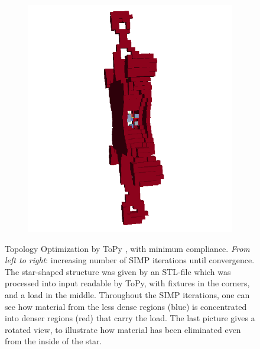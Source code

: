 \begin{figure}
\begin{subfigure}[c]{.24\linewidth}
\end{subfigure}
\begin{subfigure}[c]{.24\linewidth}
\centering
  \includegraphics[width=\linewidth]{Pictures/TopOp/Star_Optimized5_Trans.png}
\end{subfigure}
\caption{Topology Optimization by ToPy \cite{ToPy}, with minimum compliance. \emph{From left to right}: increasing number of SIMP iterations until convergence. The star-shaped structure was given by an STL-file which was processed into input readable by ToPy, with fixtures in the corners, and a load in the middle. Throughout the SIMP iterations, one can see how material from the less dense regions (blue) is concentrated into denser regions (red) that carry the load. The last picture gives a rotated view, to illustrate how material has been eliminated even from the inside of the star. } %
\label{fig: topyStar}
\end{figure}
